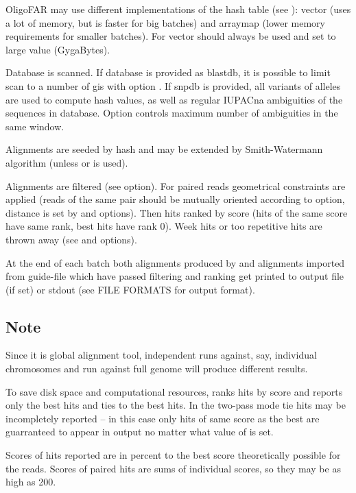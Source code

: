 \documentclass[english,letter]{article}
\begin{document}
    OligoFAR may use different implementations of the hash table (see ):
    vector (uses a lot of memory, but is faster for big batches) and
    arraymap (lower memory requirements for smaller batches). 
    For vector  should always be used and set to large value (GygaBytes).

    Database is scanned. If database is provided as blastdb, it is 
    possible to limit scan to a number of gis with option . If snpdb is
    provided, all variants of alleles are used to compute hash values, as well
    as regular IUPACna ambiguities of the sequences in database. Option 
    controls maximum number of ambiguities in the same window.

    Alignments are seeded by hash and may be extended by Smith-Watermann
    algorithm (unless  or  is used).

    Alignments are filtered (see  option). For paired reads geometrical
    constraints are applied (reads of the same pair should be mutually 
    oriented according to  option, distance is set by  and 
    options). Then hits ranked by score (hits of the same score have same
    rank, best hits have rank 0). Week hits or too repetitive hits are 
    thrown away (see  and  options).

    At the end of each batch both alignments produced by  and
    alignments imported from guide-file which have passed filtering and
    ranking get printed to output file (if set) or stdout (see 
	FILE FORMATS for output format).

\subsection{Note}

    Since it is global alignment tool, independent runs against, say,
    individual chromosomes and run against full genome will produce different 
    results.

    To save disk space and computational resources,  ranks hits by
    score and reports only the best hits and ties to the best hits. 
    In the two-pass mode tie hits may be incompletely reported -- in this 
    case only hits of same score as the best are guarranteed to appear in 
    output no matter what value of  is set.

    Scores of hits reported are in percent to the best score theoretically
    possible for the reads. Scores of paired hits are sums of individual
    scores, so they may be as high as 200.
    
\end{document}
